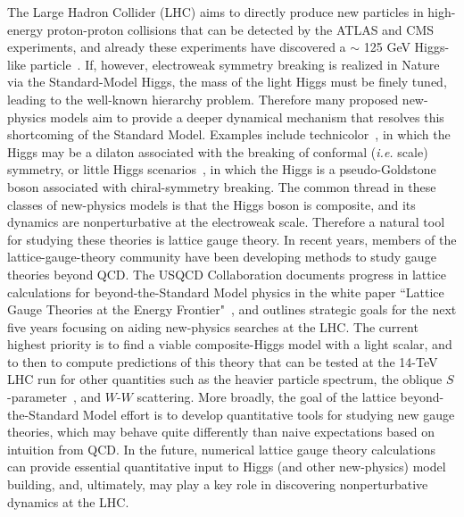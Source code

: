 The Large Hadron Collider (LHC) aims to directly produce new particles in high-energy proton-proton collisions that can be detected by the ATLAS and CMS experiments, and already these experiments have discovered a $\sim$ 125 GeV Higgs-like particle~\cite{Aad:2012tfa,Chatrchyan:2012ufa}.   If, however, electroweak symmetry breaking is realized in Nature via the Standard-Model Higgs, the mass of the light Higgs must be finely tuned, leading to the well-known hierarchy problem.   Therefore many proposed new-physics models aim to provide a deeper dynamical mechanism that resolves this shortcoming of the Standard Model.  Examples include technicolor~\cite{Farhi:1980xs,Hill:2002ap}, in which the Higgs may be a dilaton associated with the breaking of conformal ({\it i.e.} scale) symmetry, or little Higgs scenarios~\cite{Kaplan:1983sm,ArkaniHamed:2002pa,ArkaniHamed:2002qy}, in which the Higgs is a pseudo-Goldstone boson associated with chiral-symmetry breaking.  The common thread in these classes of new-physics models is that the Higgs boson is composite, and its dynamics are nonperturbative at the electroweak scale.  Therefore a natural tool for studying these theories is lattice gauge theory.   In recent years, members of the lattice-gauge-theory community have been developing methods to study gauge theories beyond QCD.  The USQCD Collaboration documents progress in lattice calculations for beyond-the-Standard Model physics in the white paper ``Lattice Gauge Theories at the Energy Frontier"~\cite{USQCD_EF_whitepaper13}, and outlines strategic goals for the next five years focusing on aiding new-physics searches at the LHC.  The current highest priority is to find a viable composite-Higgs model with a light scalar, and to then to compute predictions of this theory that can be tested at the 14-TeV LHC run for other quantities such as the heavier particle spectrum, the oblique $S$-parameter~\cite{Peskin:1990zt}, and $W$-$W$ scattering.  More broadly, the goal of the lattice beyond-the-Standard Model effort is to develop quantitative tools for studying new gauge theories, which may behave quite differently than naive expectations based on intuition from QCD.  In the future, numerical lattice gauge theory calculations can provide essential quantitative input to Higgs (and other new-physics) model building, and, ultimately, may play a key role in discovering nonperturbative dynamics at the LHC. 

